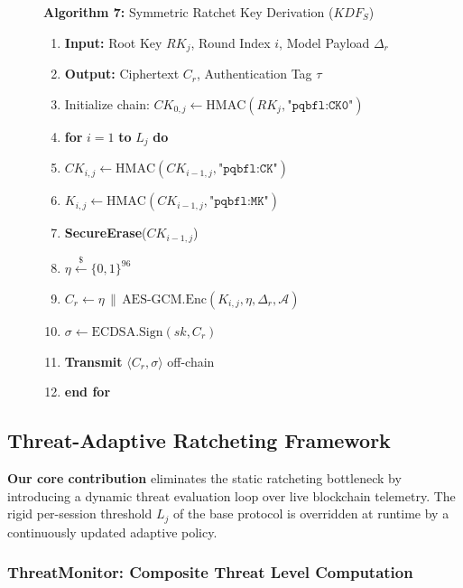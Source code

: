 \documentclass[journal, 10pt, twocolumn]{IEEEtran}
\begin{document}
\begin{figure}[!t]
\hrulefill
\vspace{-0.2cm}
\begin{center}
\textbf{Algorithm 7:} Symmetric Ratchet Key Derivation ($KDF_S$)
\end{center}
\vspace{-0.2cm}
\hrulefill
\begin{enumerate}
    \item \textbf{Input:} Root Key $RK_j$, Round Index $i$, Model Payload $\Delta_r$
    \item \textbf{Output:} Ciphertext $C_r$, Authentication Tag $\tau$
    \item Initialize chain: $CK_{0,j} \leftarrow \text{HMAC}(RK_j, \texttt{"pqbfl:CK0"})$
    \item \textbf{for} $i = 1$ \textbf{to} $L_j$ \textbf{do}
    \item \quad $CK_{i,j} \leftarrow \text{HMAC}(CK_{i-1,j}, \texttt{"pqbfl:CK"})$
    \item \quad $K_{i,j} \leftarrow \text{HMAC}(CK_{i-1,j}, \texttt{"pqbfl:MK"})$
    \item \quad \textbf{SecureErase}($CK_{i-1,j}$)
    \item \quad $\eta \xleftarrow{\$} \{0,1\}^{96}$
    \item \quad $C_r \leftarrow \eta \,\|\, \text{AES-GCM.Enc}(K_{i,j}, \eta, \Delta_r, \mathcal{A})$
    \item \quad $\sigma \leftarrow \text{ECDSA.Sign}(sk, C_r)$
    \item \quad \textbf{Transmit} $\langle C_r, \sigma \rangle$ off-chain
    \item \textbf{end for}
\end{enumerate}
\hrulefill
\end{figure}
\newpage

\subsection{Threat-Adaptive Ratcheting Framework}
\label{sec:contribution_adaptive}

\textbf{Our core contribution} eliminates the static ratcheting bottleneck by introducing a dynamic threat evaluation loop over live blockchain telemetry. The rigid per-session threshold $L_j$ of the base protocol is overridden at runtime by a continuously updated adaptive policy.

\subsubsection{ThreatMonitor: Composite Threat Level Computation}
\end{document}
